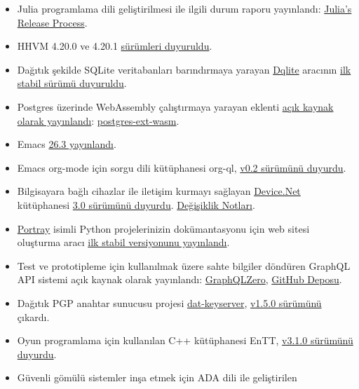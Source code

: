 \documentclass[11pt]{article}
\begin{document}
\begin{itemize}
\item Julia programlama dili geliştirilmesi ile ilgili durum raporu yayınlandı:
\href{https://julialang.org/blog/2019/08/release-process}{Julia's Release Process}.
\item HHVM 4.20.0 ve 4.20.1 \href{https://hhvm.com/blog/2019/08/27/hhvm-4.20.0.html}{sürümleri duyuruldu}.
\item Dağıtık şekilde SQLite veritabanları barındırmaya yarayan \href{https://dqlite.io/}{Dqlite} aracının
\href{https://github.com/canonical/dqlite/releases/tag/v1.0.0}{ilk stabil sürümü duyuruldu}.
\item Postgres üzerinde WebAssembly çalıştırmaya yarayan eklenti \href{https://medium.com/wasmer/announcing-the-first-postgres-extension-to-run-webassembly-561af2cfcb1}{açık kaynak
olarak yayınlandı}: \href{https://github.com/wasmerio/postgres-ext-wasm}{postgres-ext-wasm}.
\item Emacs \href{https://lists.gnu.org/archive/html/emacs-devel/2019-08/msg00577.html}{26.3 yayınlandı}.
\item Emacs org-mode için sorgu dili kütüphanesi org-ql, \href{https://github.com/alphapapa/org-ql\#02}{v0.2 sürümünü duyurdu}.
\item Bilgisayara bağlı cihazlar ile iletişim kurmayı sağlayan \href{https://github.com/MelbourneDeveloper/Device.Net}{Device.Net}
kütüphanesi \href{https://christianfindlay.com/2019/08/26/device-net-3-0/}{3.0 sürümünü duyurdu}. \href{https://github.com/MelbourneDeveloper/Device.Net/projects/8}{Değişiklik Notları}.
\item \href{https://timothycrosley.github.io/portray/}{Portray} isimli Python projelerinizin dokümantasyonu için web sitesi
oluşturma aracı \href{https://timothycrosley.github.io/portray/CHANGELOG/}{ilk stabil versiyonunu yayınlandı}.
\item Test ve prototipleme için kullanılmak üzere sahte bilgiler döndüren GraphQL
API sistemi açık kaynak olarak yayınlandı: \href{https://graphqlzero.almansi.me/}{GraphQLZero}, \href{https://github.com/ealmansi/gqlz}{GitHub Deposu}.
\item Dağıtık PGP anahtar sunucusu projesi \href{https://github.com/tdjsnelling/dat-keyserver}{dat-keyserver}, \href{https://github.com/tdjsnelling/dat-keyserver/releases/tag/v1.5.0}{v1.5.0 sürümünü} çıkardı.
\item Oyun programlama için kullanılan C++ kütüphanesi EnTT, \href{https://github.com/skypjack/entt/releases/tag/v3.1.0}{v3.1.0 sürümünü duyurdu}.
\item Güvenli gömülü sistemler inşa etmek için ADA dili ile geliştirilen

\end{itemize}
\end{document}
